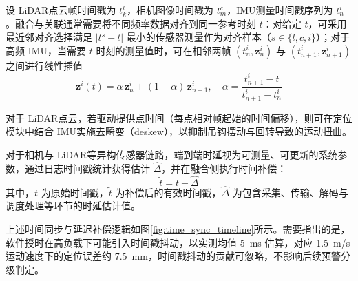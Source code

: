 设 LiDAR点云帧时间戳为 $t^{l}_k$，相机图像时间戳为 $t^{c}_m$，IMU测量时间戳序列为 $t^{i}_n$。融合与关联通常需要将不同频率数据对齐到同一参考时刻 $t$：对给定 $t$，可采用最近邻对齐选择满足 $\lvert t^{s}-t\rvert$ 最小的传感器测量作为对齐样本（$s\in\{l,c,i\}$）；对于高频 IMU，当需要 $t$ 时刻的测量值时，可在相邻两帧 $(t^{i}_{n}, \mathbf{z}^{i}_{n})$ 与 $(t^{i}_{n+1}, \mathbf{z}^{i}_{n+1})$ 之间进行线性插值
\begin{equation}
\mathbf{z}^{i}(t) = \alpha\,\mathbf{z}^{i}_{n} + (1-\alpha)\,\mathbf{z}^{i}_{n+1},\quad
\alpha = \frac{t^{i}_{n+1}-t}{t^{i}_{n+1}-t^{i}_{n}}
\end{equation}

对于 LiDAR点云，若驱动提供点时间（每点相对帧起始的时间偏移），则可在定位模块中结合 IMU实施去畸变（deskew），以抑制吊钩摆动与回转导致的运动扭曲。

对于相机与 LiDAR等异构传感器链路，端到端时延视为可测量、可更新的系统参数，通过日志时间戳统计获得估计 $\hat{\Delta}$，并在融合侧执行时间补偿：
\begin{equation}
\tilde{t} = t - \hat{\Delta}
\end{equation}
其中，$t$ 为原始时间戳，$\tilde{t}$ 为补偿后的有效时间戳，$\hat{\Delta}$ 为包含采集、传输、解码与调度处理等环节的时延估计值。

上述时间同步与延迟补偿逻辑如图\ref{fig:time_sync_timeline}所示。需要指出的是，软件授时在高负载下可能引入时间戳抖动，以实测均值 5~ms 估算，对应 1.5~m/s 运动速度下的定位误差约 7.5~mm，时间戳抖动的贡献可忽略，不影响后续预警分级判定。

